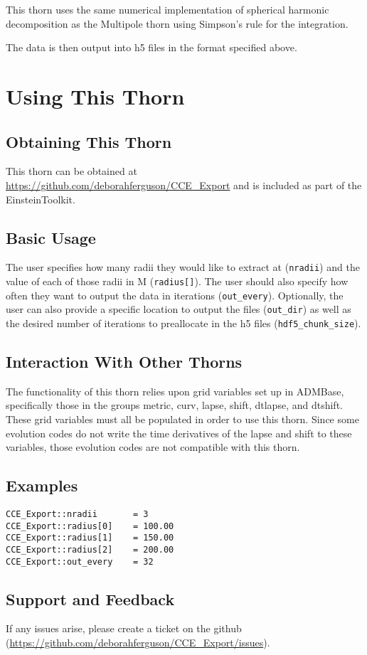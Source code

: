 \documentclass{article}
\begin{document}
This thorn uses the same numerical implementation of spherical harmonic decomposition as the Multipole thorn using 
Simpson’s rule for the integration.

The data is then output into h5 files in the format specified above.

\section{Using This Thorn}

\subsection{Obtaining This Thorn}

This thorn can be obtained at \url{https://github.com/deborahferguson/CCE_Export} and is included as part of the EinsteinToolkit.

\subsection{Basic Usage}

The user specifies how many radii they would like to extract at (\texttt{nradii}) and the value of each of those radii 
in M (\texttt{radius[]}). The user should also specify how often they want to output the data in iterations (\texttt{out\_every}).
Optionally, the user can also provide a specific location to output the files (\texttt{out\_dir}) as well as the desired 
number of iterations to preallocate in the h5 files (\texttt{hdf5\_chunk\_size}).

\subsection{Interaction With Other Thorns}

The functionality of this thorn relies upon grid variables set up in ADMBase, specifically those in the groups metric, curv, 
lapse, shift, dtlapse, and dtshift. These grid variables must all be populated in order to use this thorn. Since some 
evolution codes do not write the time derivatives of the lapse and shift to these variables, those evolution codes are not 
compatible with this thorn.

\subsection{Examples}

\begin{verbatim}
CCE_Export::nradii       = 3
CCE_Export::radius[0]    = 100.00
CCE_Export::radius[1]    = 150.00
CCE_Export::radius[2]    = 200.00
CCE_Export::out_every    = 32
\end{verbatim}

\subsection{Support and Feedback}

If any issues arise, please create a ticket on the github (\url{https://github.com/deborahferguson/CCE_Export/issues}).


\begin{thebibliography}{9}

\end{thebibliography}

\end{document}
